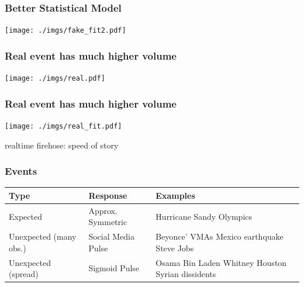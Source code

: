 \documentclass{beamer}
\begin{document}
\begin{frame}\frametitle{Better Statistical Model}
  \begin{center}
    \texttt{[image: ./imgs/fake\_fit2.pdf]}
  \end{center}
\end{frame}

\begin{frame}\frametitle{Real event has much higher volume}
  \begin{center}
    \texttt{[image: ./imgs/real.pdf]}
  \end{center}
\end{frame}

\begin{frame}\frametitle{Real event has much higher volume}
  \begin{center}
    \texttt{[image: ./imgs/real\_fit.pdf]}
  \end{center}
\end{frame}


\begin{frame}
\begin{center}
{\Huge realtime firehose: speed of story}
\end{center}
\end{frame}


\begin{frame}\frametitle{Events}
\begin{table}
\begin{tabular}{ m{2cm} | m{ 2.5cm} | m{4cm}}
\hline
Type & Response & Examples \\ \hline
Expected    & Approx. \newline Symmetric & Hurricane Sandy \newline Olympics \\ \hline
Unexpected (many obs.) & Social Media \newline Pulse & Beyonce' VMAs \newline  Mexico earthquake \newline  Steve Jobs \\ \hline
Unexpected (spread) & Sigmoid \newline Pulse & Osama Bin Laden \newline  Whitney Houston \newline  Syrian dissidents \\ \hline
\end{tabular}
\end{table}
\end{frame}
\end{document}
